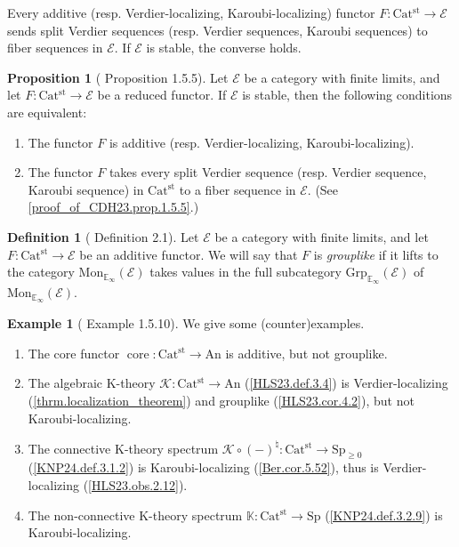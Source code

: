 \documentclass[a4paper,dvipdfmx,11pt,reqno]{amsart}
\newcommand{\E}{\mathcal{E}}
\newcommand{\K}{\mathcal{K}}
\DeclareMathOperator{\core}{core}
\newcommand{\An}{\mathrm{An}}
\newcommand{\Catst}{\mathrm{Cat^{st}}}
\newcommand{\Mon}{\mathrm{Mon}_{\mathbb{E}_{\infty}}}
\newcommand{\Grp}{\mathrm{Grp}_{\mathbb{E}_{\infty}}}
\newcommand{\Sp}{\mathrm{Sp}}
\newcommand{\bbK}{\mathbb{K}}
\theoremstyle{definition}
\newtheorem{definition}[theorem]{Definition}
\newtheorem{example}[theorem]{Example}
\newtheorem{proposition}[theorem]{Proposition}
\begin{document}
Every additive (resp. Verdier-localizing, Karoubi-localizing) functor $F : \Catst \to \E$ sends split Verdier sequences (resp. Verdier sequences, Karoubi sequences) to fiber sequences in $\E$.
If $\E$ is stable, the converse holds.

\begin{proposition}[\cite{CDH23} Proposition 1.5.5] \label{CDH23.prop.1.5.5}
  Let $\E$ be a category with finite limits, and let $F : \Catst \to \E$ be a reduced functor.
  If $\E$ is stable, then the following conditions are equivalent:
  \begin{enumerate}
    \item The functor $F$ is additive (resp. Verdier-localizing, Karoubi-localizing).
    \item The functor $F$ takes every split Verdier sequence (resp. Verdier sequence, Karoubi sequence) in $\Catst$ to a fiber sequence in $\E$.
    (See \cref{proof_of_CDH23.prop.1.5.5}.)
  \end{enumerate}
\end{proposition}

\begin{definition}[\cite{HLS23} Definition 2.1] %
  Let $\E$ be a category with finite limits, and let $F : \Catst \to \E$ be an additive functor.
  We will say that $F$ is \textit{grouplike} if it lifts to the category $\Mon(\E)$ takes values in the full subcategory $\Grp(\E)$ of $\Mon(\E)$.
\end{definition}

\begin{example}[\cite{CDH23} Example 1.5.10] \label{CDH23.eg.1.5.10}
  We give some (counter)examples.
  \begin{enumerate}
    \item The core functor $\core : \Catst \to \An$ is additive, but not grouplike. %
    \item The algebraic K-theory $\K : \Catst \to \An$ (\cref{HLS23.def.3.4}) is Verdier-localizing (\cref{thrm.localization_theorem}) and grouplike (\cref{HLS23.cor.4.2}), but not Karoubi-localizing.
    \item The connective K-theory spectrum $\K \circ (-)^{\natural} : \Catst \to \Sp_{\geq 0}$ (\cref{KNP24.def.3.1.2}) is Karoubi-localizing (\cref{Ber.cor.5.52}), thus is Verdier-localizing (\cref{HLS23.obs.2.12}).
    \item The non-connective K-theory spectrum $\bbK : \Catst \to \Sp$ (\cref{KNP24.def.3.2.9}) is Karoubi-localizing. 
  \end{enumerate}
\end{example}
\end{document}

